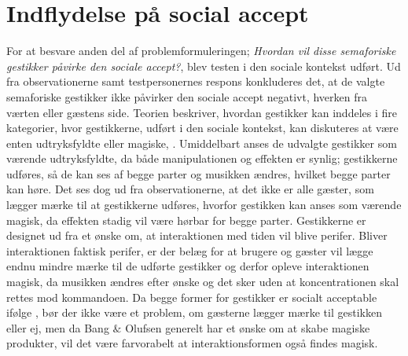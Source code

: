 \section{Indflydelse på social accept}
\label{DiskussionSocialAccept}
%
For at besvare anden del af problemformuleringen; \textit{Hvordan vil disse semaforiske gestikker påvirke den sociale accept?}, blev testen i den sociale kontekst udført. Ud fra observationerne samt testpersonernes respons konkluderes det, at de valgte semaforiske gestikker ikke påvirker den sociale accept negativt, hverken fra værten eller gæstens side. 
Teorien beskriver, hvordan gestikker kan inddeles i fire kategorier, hvor gestikkerne, udført i den sociale kontekst, kan diskuteres at være enten udtryksfyldte eller magiske, \parencite[s. 276]{PDF:WouldYouDoThat}. Umiddelbart anses de udvalgte gestikker som værende udtryksfyldte, da både manipulationen og effekten er synlig; gestikkerne udføres, så de kan ses af begge parter og musikken ændres, hvilket begge parter kan høre. Det ses dog ud fra observationerne, at det ikke er alle gæster, som lægger mærke til at gestikkerne udføres, hvorfor gestikken kan anses som værende magisk, da effekten stadig vil være hørbar for begge parter. Gestikkerne er designet ud fra et ønske om, at interaktionen med tiden vil blive perifer. Bliver interaktionen faktisk perifer, er der belæg for at brugere og gæster vil lægge endnu mindre mærke til de udførte gestikker og derfor opleve interaktionen magisk, da musikken ændres efter ønske og det sker uden at koncentrationen skal rettes mod kommandoen. Da begge former for gestikker er socialt acceptable ifølge \textcite[s. 277]{PDF:WouldYouDoThat}, bør der ikke være et problem, om gæsterne lægger mærke til gestikken eller ej, men da Bang $\&$ Olufsen generelt har et ønske om at skabe magiske produkter, vil det være farvorabelt at interaktionsformen også findes magisk.\blankline
%
